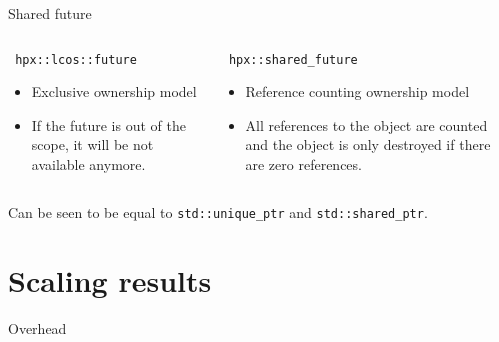 \documentclass[12pt,t]{beamer}
\begin{document}
\begin{frame}[fragile]{Shared future}

\begin{columns}
\begin{column}{0.5\textwidth}
\begin{lstlisting}
 hpx::lcos::future
\end{lstlisting}
\begin{itemize}
\item Exclusive ownership model
\item If the future is out of the scope, it will be not available anymore.
\end{itemize}
\end{column}
\begin{column}{0.5\textwidth}  
    \begin{lstlisting}
 hpx::shared_future
\end{lstlisting}
\begin{itemize}
\item Reference counting ownership model
\item All references to the object are counted and the object is only destroyed if there are zero references.
\end{itemize}
\end{column}
\end{columns}
\vspace{.5cm}
\begin{center}
Can be seen to be equal to \lstinline|std::unique_ptr| and \lstinline|std::shared_ptr|.
\end{center}
\end{frame}

\section{Scaling results}

\begin{frame}{Overhead}

\begin{center}
\end{center}
\end{frame}
\end{document}
